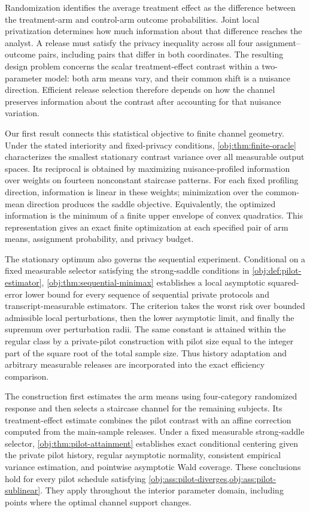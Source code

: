 Randomization identifies the average treatment effect as the difference between the treatment-arm and control-arm outcome probabilities. Joint local privatization determines how much information about that difference reaches the analyst. A release must satisfy the privacy inequality across all four assignment--outcome pairs, including pairs that differ in both coordinates. The resulting design problem concerns the scalar treatment-effect contrast within a two-parameter model: both arm means vary, and their common shift is a nuisance direction. Efficient release selection therefore depends on how the channel preserves information about the contrast after accounting for that nuisance variation.

Our first result connects this statistical objective to finite channel geometry. Under the stated interiority and fixed-privacy conditions, \cref{obj:thm:finite-oracle} characterizes the smallest stationary contrast variance over all measurable output spaces. Its reciprocal is obtained by maximizing nuisance-profiled information over weights on fourteen nonconstant staircase patterns. For each fixed profiling direction, information is linear in these weights; minimization over the common-mean direction produces the saddle objective. Equivalently, the optimized information is the minimum of a finite upper envelope of convex quadratics. This representation gives an exact finite optimization at each specified pair of arm means, assignment probability, and privacy budget.

The stationary optimum also governs the sequential experiment. Conditional on a fixed measurable selector satisfying the strong-saddle conditions in \cref{obj:def:pilot-estimator}, \cref{obj:thm:sequential-minimax} establishes a local asymptotic squared-error lower bound for every sequence of sequential private protocols and transcript-measurable estimators. The criterion takes the worst risk over bounded admissible local perturbations, then the lower asymptotic limit, and finally the supremum over perturbation radii. The same constant is attained within the regular class by a private-pilot construction with pilot size equal to the integer part of the square root of the total sample size. Thus history adaptation and arbitrary measurable releases are incorporated into the exact efficiency comparison.

The construction first estimates the arm means using four-category randomized response and then selects a staircase channel for the remaining subjects. Its treatment-effect estimate combines the pilot contrast with an affine correction computed from the main-sample releases. Under a fixed measurable strong-saddle selector, \cref{obj:thm:pilot-attainment} establishes exact conditional centering given the private pilot history, regular asymptotic normality, consistent empirical variance estimation, and pointwise asymptotic Wald coverage. These conclusions hold for every pilot schedule satisfying \cref{obj:ass:pilot-diverges,obj:ass:pilot-sublinear}. They apply throughout the interior parameter domain, including points where the optimal channel support changes.


